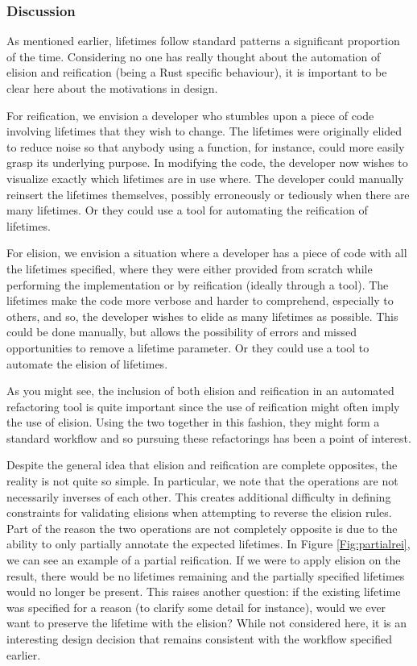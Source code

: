 \subsubsection{Discussion}

As mentioned earlier, lifetimes follow standard patterns a significant proportion of the time. Considering no one has really thought about the automation of elision and reification (being a Rust specific behaviour), it is important to be clear here about the motivations in design. 

For reification, we envision a developer who stumbles upon a piece of code involving lifetimes that they wish to change. The lifetimes were originally elided to reduce noise so that anybody using a function, for instance, could more easily grasp its underlying purpose. In modifying the code, the developer now wishes to visualize exactly which lifetimes are in use where. The developer could manually reinsert the lifetimes themselves, possibly erroneously or tediously when there are many lifetimes. Or they could use a tool for automating the reification of lifetimes.

For elision, we envision a situation where a developer has a piece of code with all the lifetimes specified, where they were either provided from scratch while performing the implementation or by reification (ideally through a tool). The lifetimes make the code more verbose and harder to comprehend, especially to others, and so, the developer wishes to elide as many lifetimes as possible. This could be done manually, but allows the possibility of errors and missed opportunities to remove a lifetime parameter. Or they could use a tool to automate the elision of lifetimes. 

As you might see, the inclusion of both elision and reification in an automated refactoring tool is quite important since the use of reification might often imply the use of elision. Using the two together in this fashion, they might form a standard workflow and so pursuing these refactorings has been a point of interest.

Despite the general idea that elision and reification are complete opposites, the reality is not quite so simple. In particular, we note that the operations are not necessarily inverses of each other. This creates additional difficulty in defining constraints for validating elisions when attempting to reverse the elision rules. Part of the reason the two operations are not completely opposite is due to the ability to only partially annotate the expected lifetimes. In Figure \ref{Fig:partialrei}, we can see an example of a partial reification. If we were to apply elision on the result, there would be no lifetimes remaining and the partially specified lifetimes would no longer be present. This raises another question: if the existing lifetime was specified for a reason (to clarify some detail for instance), would we ever want to preserve the lifetime with the elision? While not considered here, it is an interesting design decision that remains consistent with the workflow specified earlier. 

